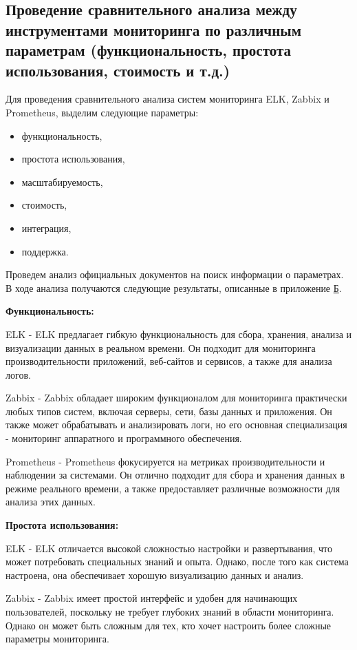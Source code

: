 \subsection{Проведение сравнительного анализа между инструментами мониторинга по различным параметрам (функциональность, простота использования, стоимость и т.д.)}

Для проведения сравнительного анализа систем мониторинга ELK, Zabbix и Prometheus, выделим следующие параметры:
\begin{itemize}
    \item функциональность,
    \item простота использования,
    \item масштабируемость,
    \item стоимость,
    \item интеграция,
    \item поддержка.
\end{itemize}

Проведем анализ официальных документов на поиск информации о параметрах. В ходе анализа получаются следующие результаты, описанные в приложение \hyperlink{app-b}{Б}.

\textbf{Функциональность:}

ELK - ELK предлагает гибкую функциональность для сбора, хранения, анализа и визуализации данных в реальном времени.
Он подходит для мониторинга производительности приложений, веб-сайтов и сервисов, а также для анализа логов.

Zabbix - Zabbix обладает широким функционалом для мониторинга практически любых типов систем, включая серверы, сети,
базы данных и приложения. Он также может обрабатывать и анализировать логи, но его основная специализация -
мониторинг аппаратного и программного обеспечения.

Prometheus - Prometheus фокусируется на метриках производительности и наблюдении за системами.
Он отлично подходит для сбора и хранения данных в режиме реального времени, а также предоставляет различные
возможности для анализа этих данных.

\textbf{Простота использования:}

ELK - ELK отличается высокой сложностью настройки и развертывания, что может потребовать специальных знаний и опыта.
Однако, после того как система настроена, она обеспечивает хорошую визуализацию данных и анализ.

Zabbix - Zabbix имеет простой интерфейс и удобен для начинающих пользователей, поскольку не требует глубоких
знаний в области мониторинга. Однако он может быть сложным для тех, кто хочет настроить более сложные параметры мониторинга.

